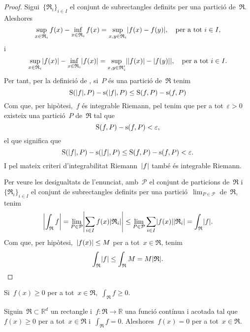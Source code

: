 \documentclass[../calcul-en-diverses-variables.tex]{subfiles}
\begin{document}
    \begin{proof}
        Sigui~\(\{\mathfrak{R}_{i}\}_{i\in I}\) el conjunt de subrectangles definits per una partició de~\(\mathfrak{R}\).
        Aleshores
        \[
            \sup_{x\in \mathfrak{R}_{i}}f(x)-\inf_{x\in \mathfrak{R}_{i}}f(x)=\sup_{x,y\in \mathfrak{R}_{i}}\abs{f(x)-f(y)},\quad\text{per a tot }i\in I,
        \]
        i
        \[
            \sup_{x\in \mathfrak{R}_{i}}\abs{f(x)}-\inf_{x\in \mathfrak{R}_{i}}\abs{f(x)}=\sup_{x,y\in \mathfrak{R}'_{i}}\abs{\abs{f(x)}-\abs{f(y)}},\quad\text{per a tot }i\in I.
        \]
        Per tant, per la definició de , si~\(P\) és una partició de~\(\mathfrak{R}\) tenim
        \[
            \Ssup(\abs{f},P)-\sinf(\abs{f},P)\leq\Ssup(f,P)-\sinf(f,P)
        \]
        Com que, per hipòtesi,~\(f\) és integrable Riemann, pel  tenim que per a tot~\(\varepsilon>0\) existeix una partició~\(P\) de~\(\mathfrak{R}\) tal que
        \[
            \operatorname{S}(f,P)-\operatorname{s}(f,P)<\varepsilon,
        \]
        el que significa que
        \[
            \Ssup(\abs{f},P)-\sinf(\abs{f},P)\leq\Ssup(f,P)-\sinf(f,P)<\varepsilon.
        \]
        I pel mateix criteri d'integrabilitat Riemann~\(\abs{f}\) també és integrable Riemann.

        Per veure les desigualtats de l'enunciat, amb~\(\mathcal{P}\) el conjunt de particions de~\(\mathfrak{R}\) i~\(\{\mathfrak{R}_{i}\}_{i\in I}\) el conjunt de subrectangles definits per una partició~\(\lim_{P\in\mathcal{P}}\) de~\(\mathfrak{R}\), tenim
        \[
            \abs{\int_{\mathfrak{R}}f}=\lim_{P\in\mathcal{P}}\abs{\sum_{i\in I}f(x)\abs{\mathfrak{R}_{i}}}\leq\lim_{P\in\mathcal{P}}\sum_{i\in I}\abs{f(x)}\abs{\mathfrak{R}_{i}}=\int_{\mathfrak{R}}\abs{f}.
        \]
        Com que, per hipòtesi,~\(\abs{f(x)}\leq M\) per a tot~\(x\in \mathfrak{R}\), tenim
        \[
            \int_{\mathfrak{R}}\abs{f}\leq\int_{\mathfrak{R}}M=M\abs{\mathfrak{R}}.\qedhere
        \]
    \end{proof}
    \begin{corollary}
        Si~\(f(x)\geq0\) per a tot~\(x\in \mathfrak{R}\),~\(\int_{\mathfrak{R}}f\geq0\).
    \end{corollary}
    \begin{proposition}
        Siguin~\(\mathfrak{R}\subset\mathbb{R}^{d}\) un rectangle i~\(f\colon\mathfrak{R}\to\mathbb{R}\) una funció contínua i acotada tal que~\(f(x)\geq0\) per a tot~\(x\in \mathfrak{R}\) i~\(\int_{\mathfrak{R}}f=0\).
        Aleshores~\(f(x)=0\) per a tot~\(x\in \mathfrak{R}\).
    \end{proposition}
\end{document}
